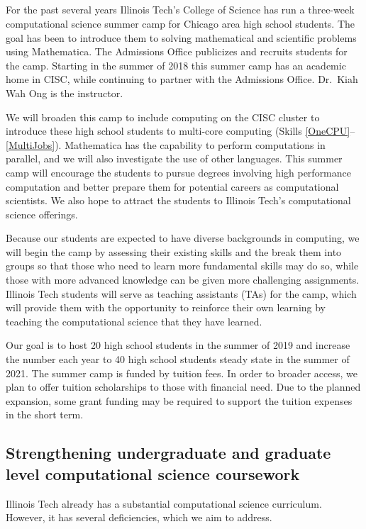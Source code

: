 \documentclass[11pt]{NSFamsart}
\begin{document}
\subsection{\CampName} \label{Camp} For the past several years Illinois Tech's College of Science has run a three-week computational science summer camp for Chicago area high school students.  The goal has been to introduce them to solving mathematical and scientific problems using Mathematica.  The Admissions Office publicizes and recruits students for the camp.  Starting in the summer of 2018 this summer camp has an academic home in CISC, while continuing to partner with the Admissions Office.  Dr.\ Kiah Wah Ong is the instructor.

We will broaden this camp to include computing on the CISC cluster to introduce these high school students to multi-core computing (Skills \ref{OneCPU}--\ref{MultiJobs}).  Mathematica has the capability to perform computations in parallel, and we will also investigate the use of other languages.  This summer camp will encourage the students to pursue degrees involving high performance computation and better prepare them for potential careers as computational scientists.  We also hope to attract the students to Illinois Tech's computational science offerings.  

Because our students are expected to have diverse backgrounds in computing, we will begin the camp by assessing their existing skills and the break them into groups so that those who need to learn more fundamental skills may do so, while those with more advanced knowledge can be given more challenging assignments.  Illinois Tech students will serve as teaching assistants (TAs) for the camp, which will provide them with the opportunity to reinforce their own learning by teaching the computational science that they have learned. 

Our goal is to host 20 high school students in the summer of 2019 and increase the number each year to 40 high school students steady state in the summer of 2021.  The summer camp is funded by tuition fees.  In order to broader access, we plan to offer tuition scholarships to those with financial need.  Due to the planned expansion, some grant funding may be required to support the tuition expenses in the short term.

\subsection{Strengthening undergraduate and graduate level computational science coursework} \label{Curr} 
Illinois Tech already has a substantial computational science curriculum.  However, it has several deficiencies, which we aim to address.
\end{document}
